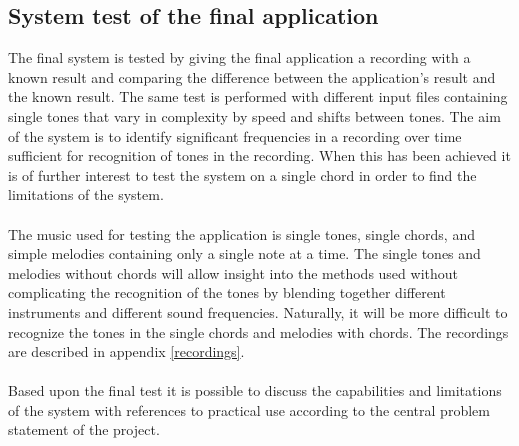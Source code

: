 \subsection{System test of the final application}\label{sec:final_test3}
The final system is tested by giving the final application a recording with a known result and comparing the difference between the application's result and the known result. The same test is performed with different input files containing single tones that vary in complexity by speed and shifts between tones. The aim of the system is to identify significant frequencies in a recording over time sufficient for recognition of tones in the recording. When this has been achieved it is of further interest to test the system on a single chord in order to find the limitations of the system.
\\ \\
The music used for testing the application is single tones, single chords, and simple melodies containing only a single note at a time. The single tones and melodies without chords will allow insight into the methods used without complicating the recognition of the tones by blending together different instruments and different sound frequencies. Naturally, it will be more difficult to recognize the tones in the single chords and melodies with chords. The recordings are described in appendix \ref{recordings}.
\\ \\
Based upon the final test it is possible to discuss the capabilities and limitations of the system with references to practical use according to the central problem statement of the project.  